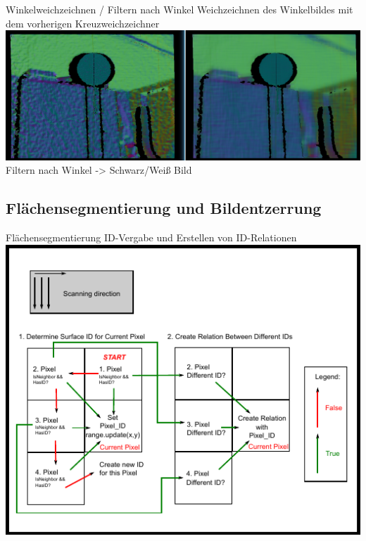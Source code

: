 \documentclass{VLKlauck}
\begin{document}
	
	\begin{frame}{Winkelweichzeichnen / Filtern nach Winkel}
		Weichzeichnen des Winkelbildes mit dem vorherigen Kreuzweichzeichner\\
		\includegraphics[width=\textwidth]{AnglesMapBlured.png}\\
		Filtern nach Winkel -> Schwarz/Weiß Bild
	\end{frame}
	
	
	
	\subsection{Flächensegmentierung und Bildentzerrung}
	\begin{frame}{Flächensegmentierung}
		ID-Vergabe und Erstellen von ID-Relationen
		\includegraphics[scale=0.8]{SurfaceSegmentation.pdf}
	\end{frame}
	
\end{document}
